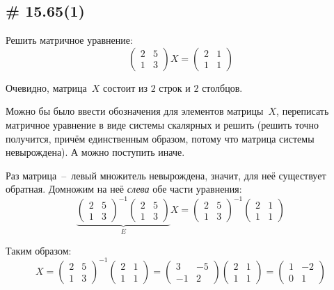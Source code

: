 \documentclass[a4paper,12pt]{article}
\theoremstyle{remark}
\begin{document}
  
  
  \subsection{\# 15.65(1)}

  Решить матричное уравнение:
  \[
    \begin{pmatrix}
      2 & 5\\
      1 & 3
    \end{pmatrix} X = \begin{pmatrix}
      2 & 1\\
      1 & 1
    \end{pmatrix}
  \]
  
  \begin{solution}
    Очевидно, матрица~$X$ состоит из $2$ строк и $2$ столбцов.
    
    Можно бы было ввести обозначения для элементов матрицы~$X$, переписать матричное уравнение в виде системы скалярных и решить (решить точно получится, причём единственным образом, потому что матрица системы невырождена).
    А можно поступить иначе.
    
    Раз матрица~--~левый множитель невырождена, значит, для неё существует обратная.
    Домножим на неё \emph{слева} обе части уравнения:
    \[
      \underbrace{\begin{pmatrix}
        2 & 5\\
        1 & 3
      \end{pmatrix}^{-1}
      \begin{pmatrix}
        2 & 5\\
        1 & 3
      \end{pmatrix}}_{E} X = \begin{pmatrix}
        2 & 5\\
        1 & 3
      \end{pmatrix}^{-1} \begin{pmatrix}
        2 & 1\\
        1 & 1
      \end{pmatrix}
    \]
    
    Таким образом:
    \[
      X = \begin{pmatrix}
        2 & 5\\
        1 & 3
      \end{pmatrix}^{-1} \begin{pmatrix}
        2 & 1\\
        1 & 1
      \end{pmatrix}
      = \begin{pmatrix}
        3 & -5\\
        -1 & 2
      \end{pmatrix} \begin{pmatrix}
        2 & 1\\
        1 & 1
      \end{pmatrix}
      = \begin{pmatrix}
        1 & -2\\
        0 & 1
      \end{pmatrix}
    \]
    

\end{solution}
\end{document}
